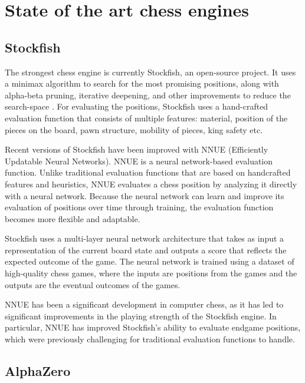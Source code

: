 \chapter{State of the art chess engines}
\label{chap:ch3}


\section{Stockfish}
\label{sec:ch3sec1}

The strongest chess engine is currently Stockfish, an open-source project. It uses a minimax algorithm to search for the most promising positions, along with alpha-beta pruning, iterative deepening, and other improvements to reduce the search-space \cite{maharaj2022chess}. For evaluating the positions, Stockfish uses a hand-crafted evaluation function that consists of multiple features: material, position of the pieces on the board, pawn structure, mobility of pieces, king safety etc. \cite{lai2015giraffe}

Recent versions of Stockfish have been improved with NNUE (Efficiently Updatable Neural Networks). NNUE is a neural network-based evaluation function. Unlike traditional evaluation functions that are based on handcrafted features and heuristics, NNUE evaluates a chess position by analyzing it directly with a neural network. Because the neural network can learn and improve its evaluation of positions over time through training, the evaluation function becomes more flexible and adaptable.

Stockfish uses a multi-layer neural network architecture that takes as input a representation of the current board state and outputs a score that reflects the expected outcome of the game. The neural network is trained using a dataset of high-quality chess games, where the inputs are positions from the games and the outputs are the eventual outcomes of the games.

NNUE has been a significant development in computer chess, as it has led to significant improvements in the playing strength of the Stockfish engine. In particular, NNUE has improved Stockfish's ability to evaluate endgame positions, which were previously challenging for traditional evaluation functions to handle.

\section{AlphaZero}
\label{sec:ch3sec2}

